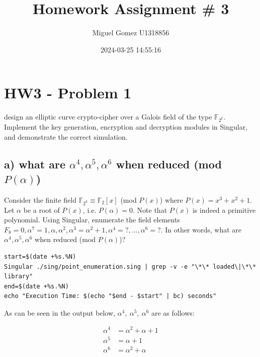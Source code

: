 \documentclass[a4paper,11pt]{exam}
\author{Miguel Gomez U1318856}
\date{2024-03-25 14:55:16}
\title{Homework Assignment \# 3}
\begin{document}
\maketitle
\tableofcontents

\newpage

\section{HW3 - Problem 1}
\label{sec:org9792939}
design an elliptic curve crypto-cipher over a Galois field of the type \(\mathbb{F}_{2^k}\).  Implement the key generation, encryption and decryption modules in Singular, and demonstrate the correct simulation.
\subsection{a) what are \(\alpha^4 , \alpha^5 , \alpha^6\) when reduced (mod \(P(\alpha)\))}
\label{sec:orgabd0cd6}
Consider the finite field \(\mathbb{F}_{2^k} \equiv \mathbb{F}_{2}[x]\) (mod \(P(x)\)) where \(P(x) = x^3 + x^2 + 1\). Let \(\alpha\) be a root of \(P(x)\), i.e. \(P(\alpha) = 0\). Note that \(P(x)\) is indeed a primitive polynomial. Using Singular, enumerate the field elements \(F_8 = {0, \alpha^7 = 1, \alpha, \alpha^2, \alpha^3 = \alpha^2 + 1, \alpha^4 =?, . . . , \alpha^6 =?}\). In other words, what are \(\alpha^4 , \alpha^5 , \alpha^6\) when reduced (mod \(P(\alpha)\))?

\begin{verbatim}
start=$(date +%s.%N)
Singular ./sing/point_enumeration.sing | grep -v -e "\*\* loaded\|\*\* library"
end=$(date +%s.%N)
echo "Execution Time: $(echo "$end - $start" | bc) seconds"
\end{verbatim}

As can be seen in the output below, \(\alpha^4,\ \alpha^5,\ \alpha^6\) are as follows:

\begin{align*}
\alpha^4 &= \alpha^2+\alpha+1\\
\alpha^5 &= \alpha+1\\
\alpha^6 &= \alpha^2+\alpha
\end{align*}
\end{document}
